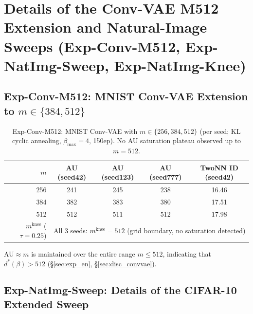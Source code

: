\documentclass[make,article,submit,pdftex,moreauthors]{Definitions/mdpi}
\newcommand{\mknee}{m^{\mathrm{knee}}}
\begin{document}
\section[\appendixname~\thesection]{Details of the Conv-VAE M512 Extension and Natural-Image Sweeps (Exp-Conv-M512, Exp-NatImg-Sweep, Exp-NatImg-Knee)}\label{app:convvae_natimg}

\subsection*{Exp-Conv-M512: MNIST Conv-VAE Extension to $m \in \{384, 512\}$}

\begin{table}[H]
\centering
\caption{Exp-Conv-M512: MNIST Conv-VAE with $m \in \{256, 384, 512\}$ (per seed; KL cyclic annealing, $\beta_\mathrm{max}=4$, 150ep). No AU saturation plateau observed up to $m=512$.}
\label{tab:en_ext}
\small
\begin{tabular}{r ccc c}
\toprule
$m$ & AU (seed42) & AU (seed123) & AU (seed777) & TwoNN ID (seed42) \\
\midrule
256 & 241 & 245 & 238 & 16.46 \\
384 & 382 & 383 & 380 & 17.51 \\
512 & 512 & 511 & 512 & 17.98 \\
\midrule
$\mknee$ ($\tau=0.25$) & \multicolumn{4}{c}{All 3 seeds: $\mknee=512$ (grid boundary, no saturation detected)} \\
\bottomrule
\end{tabular}
\end{table}

AU$\approx m$ is maintained over the entire range $m \leq 512$, indicating that $d^*(\beta) > 512$
(\S\ref{sec:exp_en}, \S\ref{sec:disc_convvae}).

\subsection*{Exp-NatImg-Sweep: Details of the CIFAR-10 Extended Sweep}
\end{document}
